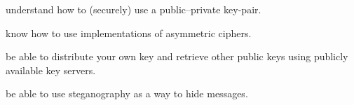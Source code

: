 \item understand how to (securely) use a public--private key-pair.
\item know how to use implementations of asymmetric ciphers.
\item be able to distribute your own key and retrieve other public keys using 
publicly available key servers.
\item be able to use steganography as a way to hide messages.
